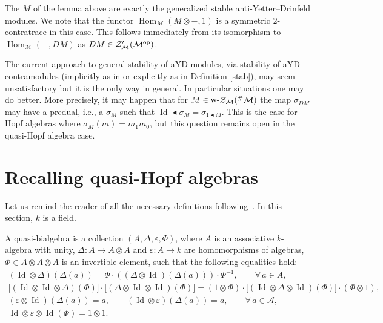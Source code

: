 \documentclass[10pt,a4paper]{amsart}
\newcommand{\Zc}{\mathcal{Z}}
\newcommand{\rab}{\blacktriangleleft}
\def\ot{\otimes}
\numberwithin{equation}{section}
\begin{document}
The $M$ of the lemma above are exactly the generalized stable anti-Yetter--Drinfeld modules. We note that the functor $\operatorname{Hom}_\mathcal{M}(M\ot-,1)$ is a symmetric $2$-contratrace in this case. This follows immediately from its isomorphism to $\operatorname{Hom}_\mathcal{M}(-,DM)$ as $DM\in\Zc_{\mathcal{M}}'(\mathcal{M}^{\rm op})$.

 \begin{Remark}\label{sigmadef}
The current approach to general stability of aYD modules, via stability of aYD contramodules (implicitly as in \cite{hks} or explicitly as in Definition \ref{stab}), may seem unsatisfactory but it is the only way in general. In particular situations one may do better. More precisely, it may happen that for $M\in\text{\rm w-}\Zc_{\mathcal{M}}({^{\#}\mathcal{M}})$ the map $\sigma_{DM}$ may have a predual, i.e., a $\sigma_M$ such that $\operatorname{Id}\rab\sigma_M=\sigma_{1\rab M}$. This is the case for Hopf algebras where $\sigma_M(m)=m_{1}m_{0}$, but this question remains open in the quasi-Hopf algebra case.
 \end{Remark}

\section{Recalling quasi-Hopf algebras}\label{s:qHopf}
 Let us remind the reader of all the necessary definitions following~\cite{Drinfeld}. In this section, $k$ is a field.
\begin{Definition}A quasi-bialgebra is a collection $(A, \Delta, \varepsilon, \Phi)$, where $A$ is an associative $k$-algebra with unity, $\Delta\colon A \rightarrow A\otimes A$ and $\varepsilon\colon A \rightarrow k $ are homomorphisms of algebras, $\Phi \in A \otimes A\otimes A$ is an invertible element, such that the following equalities hold:
\begin{gather}
(\operatorname{Id} \otimes \Delta) (\Delta (a) ) = \Phi \cdot ( (\Delta \otimes \operatorname{Id}) (\Delta(a) ) ) \cdot \Phi^{-1}, \qquad \forall\, a \in A ,\label{coassoc}\\
\lbrack (\operatorname{Id} \otimes \operatorname{Id} \otimes \Delta)(\Phi) \rbrack \cdot \lbrack (\Delta \otimes \operatorname{Id} \otimes \operatorname{Id})(\Phi) \rbrack = (1 \otimes \Phi) \cdot \lbrack (\operatorname{Id} \otimes \Delta \otimes \operatorname{Id})(\Phi) \rbrack \cdot (\Phi \otimes 1),\label{phi} \\
 (\varepsilon \otimes \operatorname{Id} ) (\Delta (a)) = a, \qquad (\operatorname{Id} \otimes \varepsilon ) (\Delta (a)) = a, \qquad \forall\, a \in \mathcal{A}, \label{one} \\
\operatorname{Id} \otimes \varepsilon \otimes \operatorname{Id} (\Phi) = 1 \otimes 1. \label{unass}
\end{gather}
\end{Definition}
\end{document}
